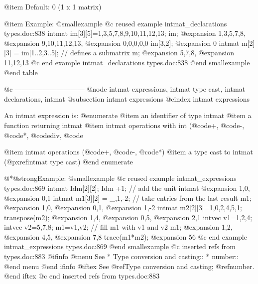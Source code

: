 {{@item Default:
0 (1 x 1 matrix)

@item Example:
@smallexample
@c reused example intmat_declarations types.doc:838 
  intmat im[3][5]=1,3,5,7,8,9,10,11,12,13;
  im;
@expansion{} 1,3,5,7,8,
@expansion{} 9,10,11,12,13,
@expansion{} 0,0,0,0,0 
  im[3,2];
@expansion{} 0
  intmat m[2][3] = im[1..2,3..5];  // defines a submatrix
  m;
@expansion{} 5,7,8,
@expansion{} 11,12,13 
@c end example intmat_declarations types.doc:838
@end smallexample
@end table

@c ------------------------------
@node intmat expressions, intmat type cast, intmat declarations, intmat
@subsection intmat expressions
@cindex intmat expressions

An intmat expression is:
@enumerate
@item
an identifier of type intmat
@item
a function returning intmat
@item
intmat operations with int (@code{+}, @code{-}, @code{*}, @code{div}, @code{%
@item
intmat operations (@code{+}, @code{-}, @code{*})
@item
a type cast to intmat (@pxref{intmat type cast})
@end enumerate

@*@strong{Example:}
@smallexample
@c reused example intmat_expressions types.doc:869 
  intmat Idm[2][2];
  Idm +1;          // add the unit intmat
@expansion{} 1,0,
@expansion{} 0,1 
  intmat m1[3][2] = _,1,-2;  // take entries from the last result
  m1;
@expansion{} 1,0,
@expansion{} 0,1,
@expansion{} 1,-2 
  intmat m2[2][3]=1,0,2,4,5,1;
  transpose(m2);
@expansion{} 1,4,
@expansion{} 0,5,
@expansion{} 2,1 
  intvec v1=1,2,4;
  intvec v2=5,7,8;
  m1=v1,v2;         // fill m1 with v1 and v2
  m1;
@expansion{} 1,2,
@expansion{} 4,5,
@expansion{} 7,8 
  trace(m1*m2);
@expansion{} 56
@c end example intmat_expressions types.doc:869
@end smallexample
@c inserted refs from types.doc:883
@ifinfo
@menu
See
* Type conversion and casting::
* number::
@end menu
@end ifinfo
@iftex
See
@ref{Type conversion and casting};
@ref{number}.
@end iftex
@c end inserted refs from types.doc:883

}}}

